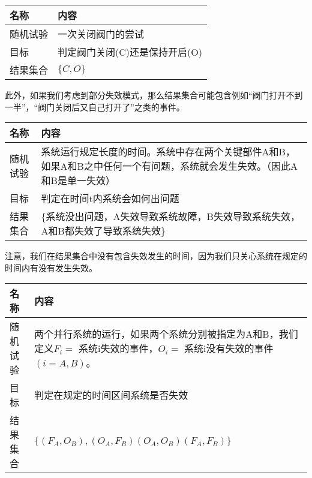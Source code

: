\documentclass[cn,11pt,chinese]{elegantbook}
\begin{document}
\begin{table}[H]
	\centering
	\begin{tabular}{@{}ll@{}}
		\toprule
		名称   & 内容                                                                                                \\ \midrule
		随机试验 & 一次关闭阀门的尝试                                                                               \\
		目标   & 判定阀门关闭(C)还是保持开启(O)                                                                                      \\
		结果集合 & $\{C,O\}$ \\ \bottomrule
	\end{tabular}
\end{table}

此外，如果我们考虑到部分失效模式，那么结果集合可能包含例如“阀门打开不到一半”，“阀门关闭后又自己打开了”之类的事件。

\begin{table}[H]
	\centering
	\begin{tabular}{@{}lp{11cm}}
		\toprule
		名称   & 内容                                                                                                \\ \midrule
		随机试验 & 系统运行规定长度的时间。系统中存在两个关键部件A和B，如果A和B之中任何一个有问题，系统就会发生失效。（因此A和B是单一失效）  \\
		目标   & 判定在时间t内系统会如何出问题                                                                                      \\
		结果集合 & \{系统没出问题，A失效导致系统故障，B失效导致系统失效，A和B都失效了导致系统失效\} \\ \bottomrule
	\end{tabular}
\end{table}

注意，我们在结果集合中没有包含失效发生的时间，因为我们只关心系统在规定的时间内有没有发生失效。

\begin{table}[H]
	\centering
	\begin{tabular}{@{}lp{11cm}}
		\toprule
		名称   & 内容                                                                                                \\ \midrule
		随机试验 & 两个并行系统的运行，如果两个系统分别被指定为A和B，我们定义$F_i=$ 系统i失效的事件，$O_i=$ 系统i没有失效的事件$(i=A,B)$。  \\
		目标   & 判定在规定的时间区间系统是否失效                                                                                     \\
		结果集合 &$\{(F_A,O_B),(O_A,F_B)(O_A,O_B)(F_A,F_B)\}$\\ \bottomrule
	\end{tabular}
\end{table}
\end{document}
